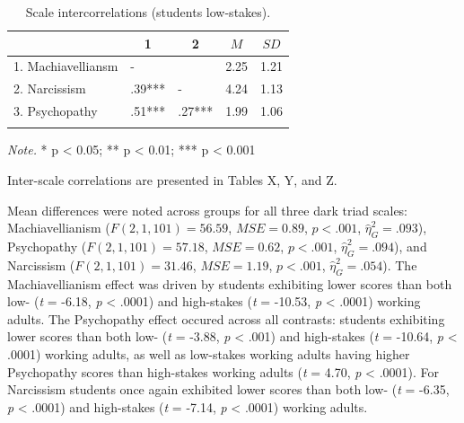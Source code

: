 \documentclass[
  english,
  man]{apa6}
\begin{document}
\begin{table}[tbp]

\begin{center}
\begin{threeparttable}

\caption{\label{tab:scalecors}Scale intercorrelations (students low-stakes).}

\begin{tabular}{lllll}
\toprule
 & \multicolumn{1}{c}{1} & \multicolumn{1}{c}{2} & \multicolumn{1}{c}{$M$} & \multicolumn{1}{c}{$SD$}\\
\midrule
1. Machiavelliansm & - &  & 2.25 & 1.21\\
2. Narcissism & .39*** & - & 4.24 & 1.13\\
3. Psychopathy & .51*** & .27*** & 1.99 & 1.06\\
\bottomrule
\addlinespace
\end{tabular}

\begin{tablenotes}[para]
\normalsize{\textit{Note.} * p < 0.05; ** p < 0.01; *** p < 0.001}
\end{tablenotes}

\end{threeparttable}
\end{center}

\end{table}

Inter-scale correlations are presented in Tables X, Y, and Z.

Mean differences were noted across groups for all three dark triad scales: Machiavellianism (\(F(2, 1,101) = 56.59\), \(\mathit{MSE} = 0.89\), \(p < .001\), \(\hat{\eta}^2_G = .093\)), Psychopathy (\(F(2, 1,101) = 57.18\), \(\mathit{MSE} = 0.62\), \(p < .001\), \(\hat{\eta}^2_G = .094\)), and Narcissism (\(F(2, 1,101) = 31.46\), \(\mathit{MSE} = 1.19\), \(p < .001\), \(\hat{\eta}^2_G = .054\)). The Machiavellianism effect was driven by students exhibiting lower scores than both low- (\emph{t} = -6.18, \emph{p} \textless{} .0001) and high-stakes (\emph{t} = -10.53, \emph{p} \textless{} .0001) working adults. The Psychopathy effect occured across all contrasts: students exhibiting lower scores than both low- (\emph{t} = -3.88, \emph{p} \textless{} .001) and high-stakes (\emph{t} = -10.64, \emph{p} \textless{} .0001) working adults, as well as low-stakes working adults having higher Psychopathy scores than high-stakes working adults (\emph{t} = 4.70, \emph{p} \textless{} .0001). For Narcissism students once again exhibited lower scores than both low- (\emph{t} = -6.35, \emph{p} \textless{} .0001) and high-stakes (\emph{t} = -7.14, \emph{p} \textless{} .0001) working adults.
\end{document}
